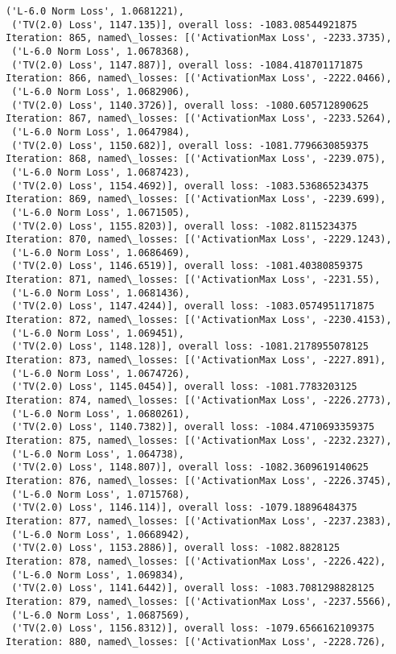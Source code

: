 \documentclass[10pt]{article}
\begin{document}
\begin{Verbatim}[commandchars=\\\{\}]
 ('L-6.0 Norm Loss', 1.0681221),
 ('TV(2.0) Loss', 1147.135)], overall loss: -1083.08544921875
Iteration: 865, named\_losses: [('ActivationMax Loss', -2233.3735),
 ('L-6.0 Norm Loss', 1.0678368),
 ('TV(2.0) Loss', 1147.887)], overall loss: -1084.418701171875
Iteration: 866, named\_losses: [('ActivationMax Loss', -2222.0466),
 ('L-6.0 Norm Loss', 1.0682906),
 ('TV(2.0) Loss', 1140.3726)], overall loss: -1080.605712890625
Iteration: 867, named\_losses: [('ActivationMax Loss', -2233.5264),
 ('L-6.0 Norm Loss', 1.0647984),
 ('TV(2.0) Loss', 1150.682)], overall loss: -1081.7796630859375
Iteration: 868, named\_losses: [('ActivationMax Loss', -2239.075),
 ('L-6.0 Norm Loss', 1.0687423),
 ('TV(2.0) Loss', 1154.4692)], overall loss: -1083.536865234375
Iteration: 869, named\_losses: [('ActivationMax Loss', -2239.699),
 ('L-6.0 Norm Loss', 1.0671505),
 ('TV(2.0) Loss', 1155.8203)], overall loss: -1082.8115234375
Iteration: 870, named\_losses: [('ActivationMax Loss', -2229.1243),
 ('L-6.0 Norm Loss', 1.0686469),
 ('TV(2.0) Loss', 1146.6519)], overall loss: -1081.40380859375
Iteration: 871, named\_losses: [('ActivationMax Loss', -2231.55),
 ('L-6.0 Norm Loss', 1.0681436),
 ('TV(2.0) Loss', 1147.4244)], overall loss: -1083.0574951171875
Iteration: 872, named\_losses: [('ActivationMax Loss', -2230.4153),
 ('L-6.0 Norm Loss', 1.069451),
 ('TV(2.0) Loss', 1148.128)], overall loss: -1081.2178955078125
Iteration: 873, named\_losses: [('ActivationMax Loss', -2227.891),
 ('L-6.0 Norm Loss', 1.0674726),
 ('TV(2.0) Loss', 1145.0454)], overall loss: -1081.7783203125
Iteration: 874, named\_losses: [('ActivationMax Loss', -2226.2773),
 ('L-6.0 Norm Loss', 1.0680261),
 ('TV(2.0) Loss', 1140.7382)], overall loss: -1084.4710693359375
Iteration: 875, named\_losses: [('ActivationMax Loss', -2232.2327),
 ('L-6.0 Norm Loss', 1.064738),
 ('TV(2.0) Loss', 1148.807)], overall loss: -1082.3609619140625
Iteration: 876, named\_losses: [('ActivationMax Loss', -2226.3745),
 ('L-6.0 Norm Loss', 1.0715768),
 ('TV(2.0) Loss', 1146.114)], overall loss: -1079.18896484375
Iteration: 877, named\_losses: [('ActivationMax Loss', -2237.2383),
 ('L-6.0 Norm Loss', 1.0668942),
 ('TV(2.0) Loss', 1153.2886)], overall loss: -1082.8828125
Iteration: 878, named\_losses: [('ActivationMax Loss', -2226.422),
 ('L-6.0 Norm Loss', 1.069834),
 ('TV(2.0) Loss', 1141.6442)], overall loss: -1083.7081298828125
Iteration: 879, named\_losses: [('ActivationMax Loss', -2237.5566),
 ('L-6.0 Norm Loss', 1.0687569),
 ('TV(2.0) Loss', 1156.8312)], overall loss: -1079.6566162109375
Iteration: 880, named\_losses: [('ActivationMax Loss', -2228.726),

\end{Verbatim}
\end{document}
